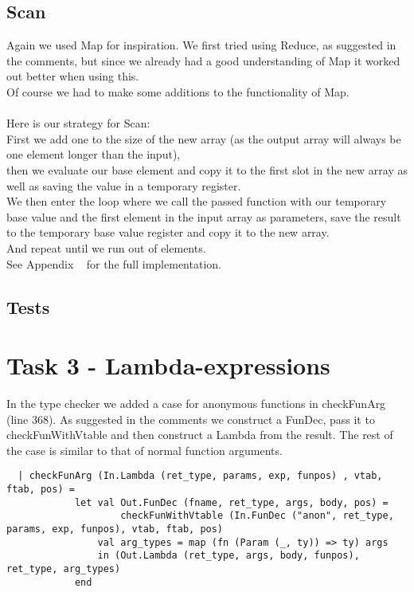 \documentclass{article}
\begin{document}
\subsection{Scan}
Again we used Map for inspiration. We first tried using Reduce, as suggested in the comments, but since we already had a good understanding of Map it worked out better when using this.\\

\noindent Of course we had to make some additions to the functionality of Map.\\\\
Here is our strategy for Scan:\\
First we add one to the size of the new array (as the output array will always be one element longer than the input),\\
then we evaluate our base element and copy it to the first slot in the new array as well as saving the value in a temporary register.\\
We then enter the loop where we call the passed function with our temporary base value and the first element in the input array as parameters, save the result to the temporary base value register and copy it to the new array.\\
And repeat until we run out of elements.\\
See Appendix ~ for the full implementation.


\subsection{Tests}

\newpage

\section{Task 3 - Lambda-expressions}
In the type checker we added a case for anonymous functions in checkFunArg (line 368). As suggested in the comments we construct a FunDec, pass it to checkFunWithVtable and then construct a Lambda from the result. The rest of the case is similar to that of normal function arguments.\\
\begin{verbatim}
  | checkFunArg (In.Lambda (ret_type, params, exp, funpos) , vtab, ftab, pos) =
            let val Out.FunDec (fname, ret_type, args, body, pos) = 
                    checkFunWithVtable (In.FunDec ("anon", ret_type, params, exp, funpos), vtab, ftab, pos)
                val arg_types = map (fn (Param (_, ty)) => ty) args
                in (Out.Lambda (ret_type, args, body, funpos), ret_type, arg_types)
            end
\end{verbatim}
\end{document}
